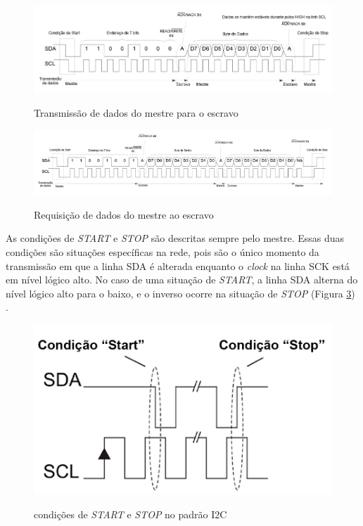 \begin{figure}[!htb]
	\centering
	\caption{Transmissão de dados do mestre para o escravo}
	\includegraphics[width=1\linewidth]{figuras/revisaobiblio/i2cwrite}
	\label{fig:i2cwrite}
\end{figure}

\begin{figure}[!htb]
	\centering
	\caption{Requisição de dados do mestre ao escravo}
	\includegraphics[width=1\linewidth]{figuras/revisaobiblio/i2cread}
	\label{fig:i2cread}
\end{figure}


As condições de \textit{START} e \textit{STOP} são descritas sempre pelo mestre. Essas duas condições são situações específicas na rede, pois são o único momento da transmissão em que a linha SDA é alterada enquanto o \textit{clock} na linha SCK está em nível lógico alto. No caso de uma situação de \textit{START}, a linha SDA alterna do nível lógico alto para o baixo, e o inverso ocorre na situação de \textit{STOP} (Figura \ref{fig:startstopconditioni2c}) \cite{site:analogI2c}.

\begin{figure}[!htb]
	\centering
	\caption{condições de \textit{START} e \textit{STOP} no padrão I2C}
	\includegraphics[width=0.65\linewidth]{figuras/revisaobiblio/startstopconditioni2c}
	\label{fig:startstopconditioni2c}
\end{figure}

